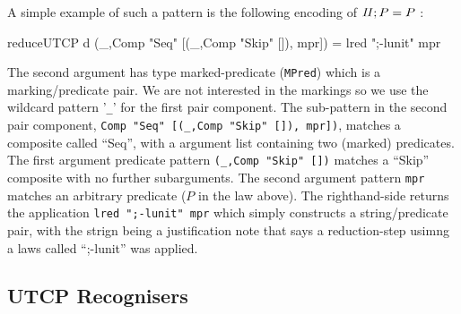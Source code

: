 A simple example of such a pattern is the following encoding
of $\mathit{II};P = P$ :
\begin{code}
reduceUTCP d
 (_,Comp "Seq" [(_,Comp "Skip" []), mpr]) = lred ";-lunit" mpr
\end{code}
The second argument has type marked-predicate (\texttt{MPred})
which is a marking/predicate pair.
We are not interested in the markings
so we use the wildcard pattern '\verb"_"'
for the first pair component.
The sub-pattern in the second pair component,
\verb'Comp "Seq" [(_,Comp "Skip" []), mpr])',
matches a composite called ``Seq'',
with a argument list containing two (marked) predicates.
The first argument predicate pattern \verb'(_,Comp "Skip" [])'
matches a ``Skip'' composite with no further subarguments.
The second argument pattern \verb'mpr' matches an arbitrary predicate
($P$ in the law above).
The righthand-side returns the application \verb'lred ";-lunit" mpr'
which simply constructs a string/predicate pair,
with the strign being a justification note that says a reduction-step
usimng a laws called ``;-lunit'' was applied.



\subsection{UTCP Recognisers}

